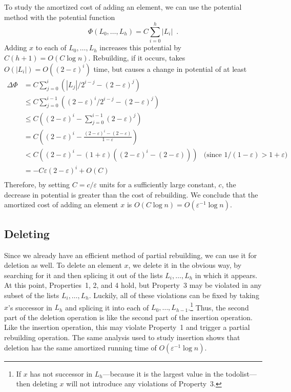 \documentclass[lotsofwhite]{patmorin}
\newcommand{\eps}{\varepsilon}
\begin{document}
To study the amortized cost of adding an element, we
can use the potential method with the potential function
\[
    \Phi(L_0,\ldots,L_h)=C\sum_{i=0}^h|L_i| \enspace .
\]
Adding $x$ to each of $L_0,\ldots,L_h$ increases this potential by
$C(h+1)=O(C\log n)$.  Rebuilding, if it occurs, takes $O(|L_i|)=O((2-\eps)^i)$
time, but causes a change in potential of at least
\begin{align*}
     \Delta\Phi & = C\sum_{j=0}^i\left(|L_j|/2^{i-j} - (2-\eps)^j\right) \\
          & \le C\sum_{j=0}^{i-1}\left((2-\eps)^i/2^{i-j} - (2-\eps)^j\right) \\
          & \le C\left((2-\eps)^i - \sum_{j=0}^{i-1}(2-\eps)^j\right) \\
          & = C\left((2-\eps)^i - \frac{(2-\eps)^i-(2-\eps)}{1-\eps}\right) \\
          & < C\left((2-\eps)^i - (1+\eps)\left((2-\eps)^i-(2-\eps)\right)\right)
           & \text{(since $1/(1-\eps)>1+\eps$)} \\
          & = -C\eps(2-\eps)^i + O(C) \\
\end{align*}
Therefore, by setting $C=c/\eps$ units for a sufficiently large constant,
$c$, the decrease in potential is greater than the cost of rebuilding.
We conclude that the amortized cost of adding an element $x$ is $O(C\log
n)=O(\eps^{-1}\log n)$.

\subsection{Deleting}

Since we already have an efficient method of partial rebuilding, we
can use it for deletion as well. To delete an element $x$, we delete
it in the obvious way, by searching for it and then splicing it out
of the lists $L_i,\ldots,L_h$ in which it appears.  At this point,
Properties~1, 2, and 4 hold, but Property~3 may be violated in any
subset of the lists $L_i,\ldots,L_h$.  Luckily, all of these violations
can be fixed by taking $x$'s successor in $L_h$ and splicing it into
each of $L_0,\ldots,L_{h-1}$.\footnote{If $x$ has not successor in
$L_h$---because it is the largest value in the todolist---then deleting
$x$ will not introduce any violations of Property~3.}  Thus, the second
part of the deletion operation is like the second part of the insertion
operation.  Like the insertion operation, this may violate Property~1
and trigger a partial rebuilding operation.  The same analysis used to
study insertion shows that deletion has the same amortized running time
of $O(\eps^{-1}\log n)$.
\end{document}
